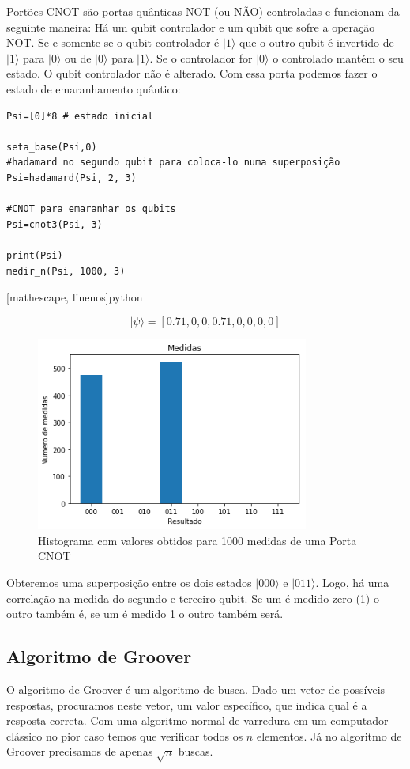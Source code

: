 \documentclass[12pt,a4paper]{article}
\begin{document}
 Portões CNOT são portas quânticas NOT (ou NÃO) controladas e funcionam da seguinte maneira: Há um qubit controlador e um qubit que sofre a operação NOT. Se e somente se o qubit controlador é $|1\rangle$ que o outro qubit é invertido de $|1\rangle$ para $|0\rangle$ ou de $|0\rangle$ para $|1\rangle$. Se o controlador for $|0\rangle$ o controlado mantém o seu estado. O qubit controlador não é alterado. Com essa porta podemos fazer o estado de emaranhamento quântico:
 
 \begin{verbatim}
Psi=[0]*8 # estado inicial

seta_base(Psi,0)
#hadamard no segundo qubit para coloca-lo numa superposição
Psi=hadamard(Psi, 2, 3)  

#CNOT para emaranhar os qubits
Psi=cnot3(Psi, 3)

print(Psi)
medir_n(Psi, 1000, 3)
 \end{verbatim}[mathescape, linenos]{python}

$$|\psi\rangle = [0.71, 0, 0, 0.71, 0, 0, 0, 0]$$

\begin{figure}
    \centering
    \includegraphics[width=0.8\textwidth]{relatorio-superposicao.png}
    \caption{Histograma com valores obtidos para 1000 medidas de uma Porta CNOT }
    \label{fig:CNOT}
\end{figure}

Obteremos uma superposição entre os dois estados $|000\rangle$ e $|011\rangle$.  Logo, há uma correlação na medida do segundo e terceiro qubit. Se um é medido zero (1) o outro também é, se um é medido 1 o outro também será.




\subsection{Algoritmo de Groover}
O algoritmo de Groover é um algoritmo de busca. Dado um vetor de possíveis respostas,  procuramos neste vetor, um valor específico, que indica qual é a resposta correta. 
Com uma algoritmo normal de varredura em um computador clássico no pior caso temos que verificar todos os $n$ elementos. Já no algoritmo de Groover precisamos de apenas $\sqrt{n}$ buscas.
\end{document}
